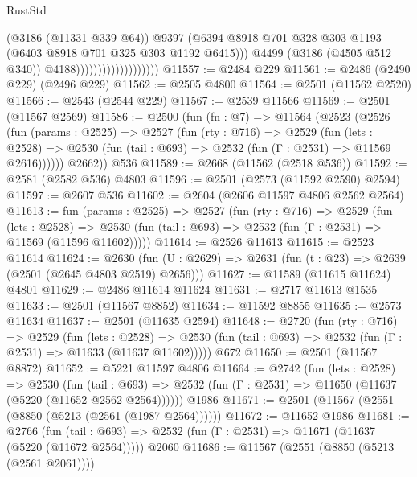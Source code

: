 \begin{lexlean}{RustStd}
\begin{coremodule}
                                            (@3186 (@11331 @339 @64))
                                            @9397
                                            (@6394
                                              @8918
                                              @701
                                              @328
                                              @303
                                              @1193
                                              (@6403 @8918 @701 @325 @303 @1192 @6415)))
                                          @4499
                                          (@3186 (@4505 @512 @340))
                                          @4188)))))))))))))))))))
@11557 := @2484 @229
@11561 := @2486 (@2490 @229) (@2496 @229)
@11562 := @2505 @4800
@11564 := @2501 (@11562 @2520)
@11566 := @2543 (@2544 @229)
@11567 := @2539 @11566
@11569 := @2501 (@11567 @2569)
@11586 := @2500
    (fun (fn : @7) =>
    @11564
      (@2523
        (@2526
          (fun (params : @2525) =>
          @2527
            (fun (rty : @716) =>
            @2529
              (fun (lets : @2528) =>
              @2530 (fun (tail : @693) => @2532 (fun (Γ : @2531) => @11569 @2616))))))
        @2662))
    @536
@11589 := @2668 (@11562 (@2518 @536))
@11592 := @2581 (@2582 @536) @4803
@11596 := @2501 (@2573 (@11592 @2590) @2594)
@11597 := @2607 @536
@11602 := @2604 (@2606 @11597 @4806 @2562 @2564)
@11613 := fun (params : @2525) =>
  @2527
    (fun (rty : @716) =>
    @2529
      (fun (lets : @2528) =>
      @2530 (fun (tail : @693) => @2532 (fun (Γ : @2531) => @11569 (@11596 @11602)))))
@11614 := @2526 @11613
@11615 := @2523 @11614
@11624 := @2630
    (fun (U : @2629) => @2631 (fun (t : @23) => @2639 (@2501 (@2645 @4803 @2519) @2656)))
@11627 := @11589 (@11615 @11624) @4801
@11629 := @2486 @11614 @11624
@11631 := @2717 @11613 @1535
@11633 := @2501 (@11567 @8852)
@11634 := @11592 @8855
@11635 := @2573 @11634
@11637 := @2501 (@11635 @2594)
@11648 := @2720
    (fun (rty : @716) =>
    @2529
      (fun (lets : @2528) =>
      @2530 (fun (tail : @693) => @2532 (fun (Γ : @2531) => @11633 (@11637 @11602)))))
    @672
@11650 := @2501 (@11567 @8872)
@11652 := @5221 @11597 @4806
@11664 := @2742
    (fun (lets : @2528) =>
    @2530
      (fun (tail : @693) =>
      @2532 (fun (Γ : @2531) => @11650 (@11637 (@5220 (@11652 @2562 @2564))))))
    @1986
@11671 := @2501 (@11567 (@2551 (@8850 (@5213 (@2561 (@1987 @2564))))))
@11672 := @11652 @1986
@11681 := @2766
    (fun (tail : @693) => @2532 (fun (Γ : @2531) => @11671 (@11637 (@5220 (@11672 @2564)))))
    @2060
@11686 := @11567 (@2551 (@8850 (@5213 (@2561 @2061))))

\end{coremodule}
\end{lexlean}
